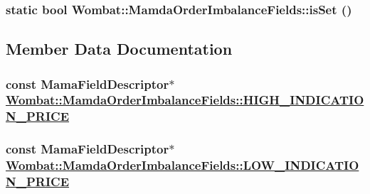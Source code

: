 \hypertarget{classWombat_1_1MamdaOrderImbalanceFields_15e5163f7a0749f88bddd4afb352ae24}{
\subsubsection[isSet]{\setlength{\rightskip}{0pt plus 5cm}static bool Wombat::Mamda\-Order\-Imbalance\-Fields::is\-Set ()}}
\label{classWombat_1_1MamdaOrderImbalanceFields_15e5163f7a0749f88bddd4afb352ae24}




\subsection{Member Data Documentation}
\hypertarget{classWombat_1_1MamdaOrderImbalanceFields_f3a2769ed37b714c13d002cf96e8b38d}{
\subsubsection[HIGH\_\-INDICATION\_\-PRICE]{\setlength{\rightskip}{0pt plus 5cm}const Mama\-Field\-Descriptor$\ast$ \hyperlink{classWombat_1_1MamdaOrderImbalanceFields_f3a2769ed37b714c13d002cf96e8b38d}{Wombat::Mamda\-Order\-Imbalance\-Fields::HIGH\_\-INDICATION\_\-PRICE}}}
\label{classWombat_1_1MamdaOrderImbalanceFields_f3a2769ed37b714c13d002cf96e8b38d}


\hypertarget{classWombat_1_1MamdaOrderImbalanceFields_f29ad6ffd450ef2856ee4eca7706c162}{
\subsubsection[LOW\_\-INDICATION\_\-PRICE]{\setlength{\rightskip}{0pt plus 5cm}const Mama\-Field\-Descriptor$\ast$ \hyperlink{classWombat_1_1MamdaOrderImbalanceFields_f29ad6ffd450ef2856ee4eca7706c162}{Wombat::Mamda\-Order\-Imbalance\-Fields::LOW\_\-INDICATION\_\-PRICE}}}
\label{classWombat_1_1MamdaOrderImbalanceFields_f29ad6ffd450ef2856ee4eca7706c162}



